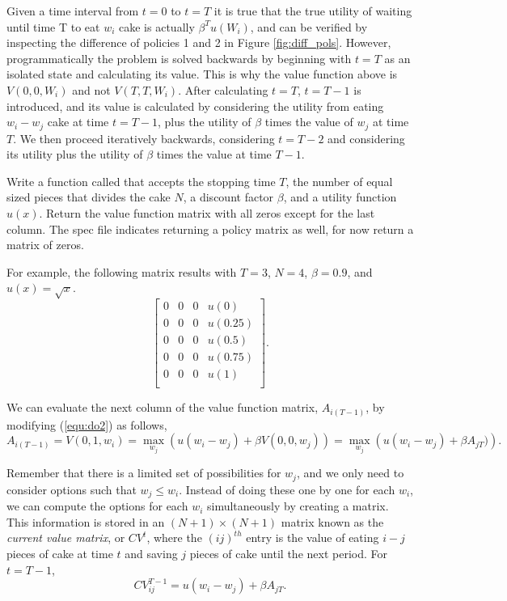 \begin{warn}
Given a time interval from $t=0$ to $t=T$ it is true that the true utility of waiting until time T to eat $w_i$ cake is actually $\beta^Tu(W_{i})$, and can be verified by inspecting the difference of policies 1 and 2 in Figure \ref{fig:diff_pols}.
However, programmatically the problem is solved backwards by beginning with $t=T$ as an isolated state and calculating its value.
This is why the value function above is $V(0, 0, W_i)$ and not $V(T, T, W_i)$.
After calculating $t=T$, $t=T-1$ is introduced, and its value is calculated by considering the utility from eating $w_i - w_j$ cake at time $t=T-1$, plus the utility of $\beta$ times the value of $w_j$ at time $T$.
We then proceed iteratively backwards, considering $t=T-2$ and considering its utility plus the utility of $\beta$ times the value at time $T-1$.
\end{warn}

\begin{problem}
Write a function called  that accepts
the stopping time $T$,
the number of equal sized pieces that divides the cake $N$,
a discount factor $\beta$, and
a utility function $u(x)$.
Return the value function matrix with all zeros except for the last column.
The spec file indicates returning a policy matrix as well, for now return a matrix of zeros.

For example, the following matrix results with $T=3$, $N=4$, $\beta=0.9$, and $u(x) = \sqrt{x}$.
\[
\begin{bmatrix}
0 & 0 & 0 & u(0) \\
0 & 0 & 0 & u(0.25) \\
0 & 0 & 0 & u(0.5) \\
0 & 0 & 0 & u(0.75) \\
0 & 0 & 0 & u(1) \\
\end{bmatrix}.
\]
\end{problem}

We can evaluate the next column of the value function matrix, $A_{i(T-1)}$, by modifying  (\ref{equ:do2}) as follows,
\begin{equation}\label{equ:do3}
A_{i(T-1)} = V(0, 1, w_{i}) = \max_{w_j}\left(u(w_{i} - w_{j}) + \beta V(0,0,w_{j})\right) = \max_{w_j}\left(u(w_{i} - w_{j}) + \beta A_{jT})\right).
\end{equation}

Remember that there is a limited set of possibilities for $w_j$, and we only need to consider options such that $w_j \leq w_i$.
Instead of doing these one by one for each $w_i$, we can compute the options for each $w_i$ simultaneously by creating a matrix.
This information is stored in an $(N+1) \times (N+1)$ matrix known as the \emph{current value matrix}, or $CV^t$, where the $(ij)^{th}$ entry is the value of eating $i-j$ pieces of cake at time $t$ and saving $j$ pieces of cake until the next period.
For $t = T-1$,
\begin{equation}\label{equ:do4}
CV^{T-1}_{ij} = u(w_i - w_j) + \beta A_{jT}.
\end{equation}

